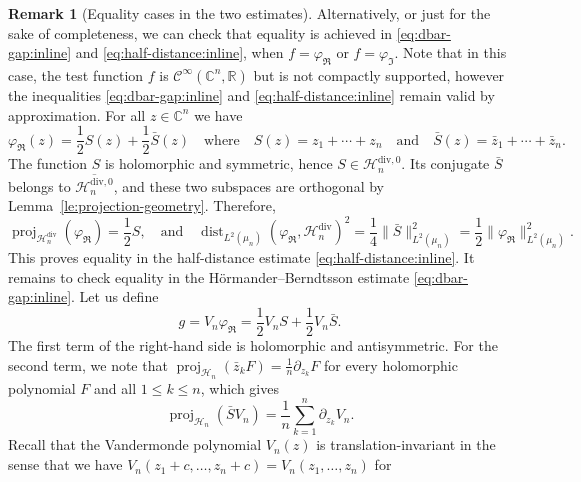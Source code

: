 \documentclass[11pt,reqno]{amsart}
\numberwithin{equation}{section}%
\numberwithin{figure}{section}%
\numberwithin{table}{section}
\theoremstyle{plain}
\theoremstyle{definition}
\newtheorem{remark}[theorem]{Remark}
\begin{document}
\begin{remark}[Equality cases in the two estimates]
  Alternatively, or just for the sake of completeness, we can check that
  equality is achieved in \eqref{eq:dbar-gap:inline} and
  \eqref{eq:half-distance:inline}, when $f=\varphi_\Re$ or $f=\varphi_\Im$.
  Note that in this case, the test function $f$ is
  $\mathcal{C}^\infty(\mathbb{C}^n,\mathbb{R})$ but is not compactly
  supported, however the inequalities \eqref{eq:dbar-gap:inline} and
  \eqref{eq:half-distance:inline} remain valid by approximation. For all
  $z\in\mathbb{C}^n$ we have
  \begin{equation}\label{eq:real-M-split}
    \varphi_\Re(z)=\frac{1}{2}S(z)+\frac{1}{2}\bar{S}(z)
    \quad\text{where}\quad
    S(z)=z_1+\cdots+z_n
    \quad\text{and}\quad
    \bar{S}(z)=\bar{z}_1+\cdots+\bar{z}_n.
  \end{equation}
  The function $S$ is holomorphic and symmetric, hence
  $S\in\mathcal{H}_n^{\mathrm{div},0}$. Its conjugate $\bar{S}$ belongs to
  $\overline{\mathcal{H}_n^{\mathrm{div},0}}$, and these two subspaces are
  orthogonal by Lemma~\ref{le:projection-geometry}. Therefore,
  \begin{equation}\label{eq:projection-real-M}
    \operatorname{proj}_{\mathcal{H}_n^{\mathrm{div}}}(\varphi_\Re)=\frac{1}{2}S,
    \quad\text{and}\quad
    \operatorname{dist}_{L^2(\mu_n)}(\varphi_\Re,\mathcal{H}_n^{\mathrm{div}})^2
    =\frac{1}{4}\|\bar{S}\|^2_{L^2(\mu_n)}
    =\frac{1}{2}\|\varphi_\Re\|^2_{L^2(\mu_n)}.
  \end{equation}
  This proves equality in the half-distance estimate
  \eqref{eq:half-distance:inline}. It remains to check equality in the
  Hörmander--Berndtsson estimate \eqref{eq:dbar-gap:inline}. Let us define
  \begin{equation}\label{eq:g-real-M}
    g = V_n\varphi_\Re = \frac{1}{2}V_nS+\frac{1}{2}V_n\bar{S}.
  \end{equation}
  The first term of the right-hand side is holomorphic and antisymmetric. For
  the second term, we note that
  $\operatorname{proj}_{\mathcal{H}_n}(\bar z_kF)=\frac{1}{n}\partial_{z_k}F$
  for every holomorphic polynomial $F$ and all $1\leq k\leq n$, which gives
  \begin{equation}\label{eq:proj-bar-M-vand}
    \operatorname{proj}_{\mathcal{H}_n}(\bar{S}V_n) = \frac{1}{n}\sum_{k=1}^n\partial_{z_k}V_n.
  \end{equation}
  Recall that the Vandermonde polynomial $V_n(z)$ is translation-invariant in
  the sense that we have $V_n(z_1+c,\ldots,z_n+c) = V_n(z_1,\ldots,z_n)$ for

\end{remark}
\end{document}
